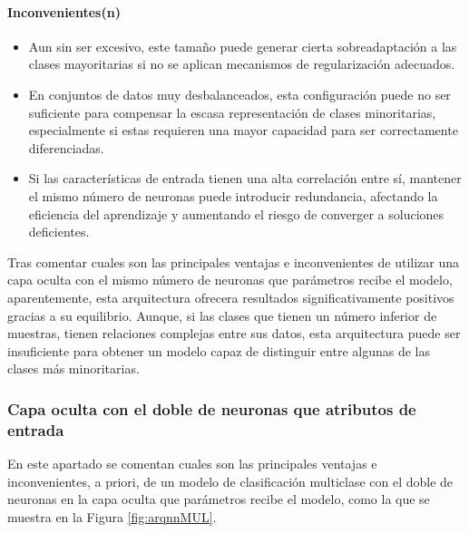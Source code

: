\paragraph{Inconvenientes(n)}
\begin{itemize}
	\item Aun sin ser excesivo, este tamaño puede generar cierta sobreadaptación a las clases mayoritarias si no se aplican mecanismos de regularización adecuados.
	\item En conjuntos de datos muy desbalanceados, esta configuración puede no ser suficiente para compensar la escasa representación de clases minoritarias, especialmente si estas requieren una mayor capacidad para ser correctamente diferenciadas.
	\item Si las características de entrada tienen una alta correlación entre sí, mantener el mismo número de neuronas puede introducir redundancia, afectando la eficiencia del aprendizaje y aumentando el riesgo de converger a soluciones deficientes.
\end{itemize}

Tras comentar cuales son las principales ventajas e inconvenientes de utilizar una capa oculta con el mismo número de neuronas que parámetros recibe el modelo, aparentemente, esta arquitectura ofrecera resultados significativamente positivos gracias a su equilibrio. Aunque, si las clases que tienen un número inferior de muestras, tienen relaciones complejas entre sus datos, esta arquitectura puede ser insuficiente para obtener un modelo capaz de distinguir entre algunas de las clases más minoritarias.

\subsubsection{Capa oculta con el doble de neuronas que atributos de entrada}\label{sec:VIMUL98}
En este apartado se comentan cuales son las principales ventajas e inconvenientes, a priori, de un modelo de clasificación multiclase con el doble de neuronas en la capa oculta que parámetros recibe el modelo, como la que se muestra en la Figura \ref{fig:arqnnMUL}.

